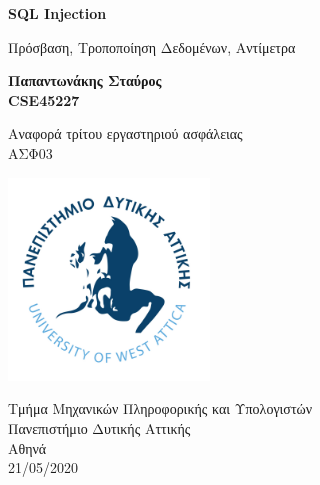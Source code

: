 %
%
%
\begin{titlepage}
	\begin{center}
		\vspace{1cm}	
		\Huge	
		\textbf{SQL Injection}
		
		\vspace{0.5cm}
		\large
		Πρόσβαση, Τροποποίηση Δεδομένων, Αντίμετρα
				
		\vspace{1.5cm}
		\textbf{Παπαντωνάκης Σταύρος\\ CSE45227}
		\vfill
		
		Αναφορά τρίτου εργαστηριού ασφάλειας\\
		ΑΣΦ03
		\vspace{0.8cm}
		\begin{center}
			\includegraphics[width=0.4\textwidth]{image/logo.jpg}		
		\end{center}
		\normalsize
		Τμήμα Μηχανικών Πληροφορικής και Υπολογιστών\\
		Πανεπιστήμιο Δυτικής Αττικής\\
		Αθηνά\\
		21/05/2020\\	
	\end{center}
\end{titlepage}